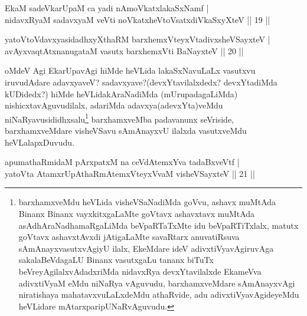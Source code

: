 
\begin{shl}
EkaM sadeVkarUpaM ca yadi nAmoVkatxlakaSxNamf |\\
nidavxRyaM sadavxyaM veVti noVkatxheVtoVsatxdiVkaSxyXteV \hfill || 19 ||
\end{shl}

\begin{shl}
yatoV\s toV\s davxyasidadhxyXthaRM barxhemxVteyxVtadivxsheVSayxteV |\\
avAyxvaqtAtxnanugataM vasutx barxhemxVti BaNayxteV \hfill || 20 ||
\end{shl}

\begin{artha}
oMdeV Agi EkarUpavAgi hiMde heVLida lakaSxNavuLaLx vasutxvu iruvudAdare adavxyaveV? sadavxyave?(devxYtavilalxdedx? devxYtadiMda kUDidedx?) hiMde heVLidakAraNadiMda (mUrupadagaLiMda) nishicxtavAguvudilalx, adariMda adavxya(adevxYta)veMdu niNaRyavu\break sididhxsalu\footnote{barxhamxveMdu heVLida visheVSaNadiMda goVvu, ashavx muMtAda Binanx Binanx vayxkitxgaLaMte goVtavx ashavxtavx muMtAda asAdhAraNadhamaRgaLiMda beVpaRTaTxMte idu beVpaRTiTxlalx, matutx goVtavx ashavxtAvxdi jAtigaLaMte savaRtarx anuvatiRsuva sAmAnayxvasutxvAgiyU ilalx, EkeMdare ideV adivxtiVyavAgiruvAga sakalaBeVdagaLU Binanx vasutxgaLu tananx biTuTx beVreyAgilalxvAdadxriMda nidavxRya devxYtavilalxde EkameVva adivxtiVyaM eMdu niNaRya vAguvudu, barxhamxveMdare sAmAnayxvAgi niratishaya mahatavxvuLaLxdeMdu athaRvide, adu adivxtiVyavAgideyeMdu heVLidare mAtarx\break paripUNaRvAguvudu.} barxhamxveMba padavanunx seVriside, barxhamxveMdare visheVSavu sAmAnayxvU ilalxda vasutxveMdu heVLalapxDuvudu.
\end{artha}






\begin{shl}
apumathaRmidaM pArxpatxM na ceVdAtemxYva tadaBxveVtf |\\
yatoV\s ta AtamxrUpAthaRmAtemxVteyxVvaM visheVSayxteV \hfill || 21 ||
\end{shl}

